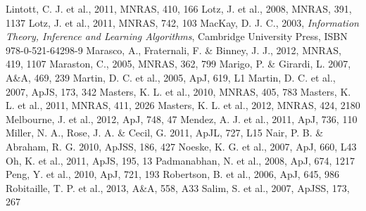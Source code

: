 \documentclass{mn2e}
\begin{document}
\begin{thebibliography}{}
 Lintott, C. J. et al., 2011, MNRAS, 410, 166
 Lotz, J. et al., 2008, MNRAS, 391, 1137
 Lotz, J. et al., 2011, MNRAS, 742, 103
 MacKay, D. J. C., 2003, \emph{Information Theory, Inference and Learning Algorithms}, Cambridge University Press, ISBN 978-0-521-64298-9
 Marasco, A., Fraternali, F. \& Binney, J. J., 2012, MNRAS, 419, 1107
 Maraston, C., 2005, MNRAS, 362, 799
 Marigo, P. \& Girardi, L. 2007, A\&A, 469, 239
 Martin, D. C. et al., 2005, ApJ, 619, L1
 Martin, D. C. et al., 2007, ApJS, 173, 342
 Masters, K. L. et al., 2010, MNRAS, 405, 783
 Masters, K. L. et al., 2011, MNRAS, 411, 2026
 Masters, K. L. et al., 2012, MNRAS, 424, 2180
 Melbourne, J. et al., 2012, ApJ, 748, 47
 Mendez, A. J. et al., 2011, ApJ, 736, 110
 Miller, N. A., Rose, J. A. \& Cecil, G. 2011, ApJL, 727, L15
 Nair, P. B. \& Abraham, R. G. 2010, ApJSS, 186, 427 
 Noeske, K. G. et al., 2007, ApJ, 660, L43
 Oh, K. et al., 2011, ApJS, 195, 13
 Padmanabhan, N. et al., 2008, ApJ, 674, 1217
 Peng, Y. et al., 2010, ApJ, 721, 193
 Robertson, B. et al., 2006, ApJ, 645, 986
 Robitaille, T. P. et al., 2013, A\&A, 558, A33
 Salim, S. et al., 2007, ApJSS, 173, 267

\end{thebibliography}
\end{document}
